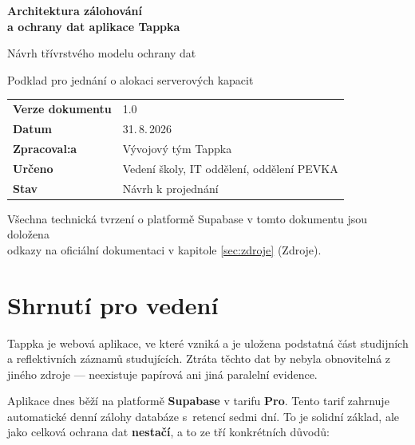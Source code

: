 \documentclass[11pt,a4paper]{article}
\begin{document}
\begin{titlepage}
\centering
\vspace*{2.5cm}

{\Huge\bfseries\color{accent} Architektura zálohování\\[0.35em] a ochrany dat aplikace Tappka\par}

\vspace{1.2cm}
{\Large Návrh třívrstvého modelu ochrany dat\par}
\vspace{0.4cm}
{\large\color{muted} Podklad pro jednání o alokaci serverových kapacit\par}

\vspace{3cm}

\begin{tabular}{@{}ll@{}}
\textbf{Verze dokumentu} & 1.0 \\
\textbf{Datum} & 31.\,8.\,2026 \\
\textbf{Zpracoval:a} & Vývojový tým Tappka \\
\textbf{Určeno} & Vedení školy, IT oddělení, oddělení PEVKA \\
\textbf{Stav} & Návrh k projednání \\
\end{tabular}

\vfill
{\small\color{muted} Všechna technická tvrzení o platformě Supabase v tomto dokumentu jsou doložena\\ odkazy na oficiální dokumentaci v kapitole \ref{sec:zdroje} (Zdroje).\par}
\end{titlepage}

\tableofcontents
\newpage

\section{Shrnutí pro vedení}

Tappka je webová aplikace, ve které vzniká a je uložena podstatná část studijních a reflektivních
záznamů studujících. Ztráta těchto dat by nebyla obnovitelná z jiného zdroje --- neexistuje
papírová ani jiná paralelní evidence.

Aplikace dnes běží na platformě \textbf{Supabase} v tarifu \textbf{Pro}. Tento tarif zahrnuje
automatické denní zálohy databáze s~retencí sedmi dní. To je solidní základ, ale jako celková
ochrana dat \textbf{nestačí}, a to ze tří konkrétních důvodů:
\end{document}
